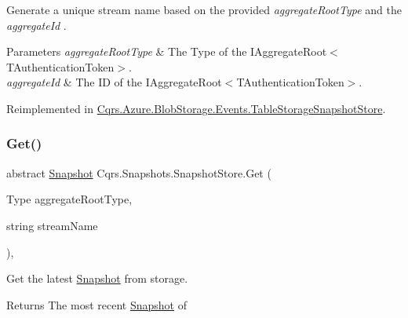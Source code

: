 Generate a unique stream name based on the provided {\itshape aggregate\+Root\+Type}  and the {\itshape aggregate\+Id} . 


\begin{DoxyParams}{Parameters}
{\em aggregate\+Root\+Type} & The Type of the I\+Aggregate\+Root$<$\+T\+Authentication\+Token$>$.\\
\hline
{\em aggregate\+Id} & The ID of the I\+Aggregate\+Root$<$\+T\+Authentication\+Token$>$.\\
\hline
\end{DoxyParams}


Reimplemented in \hyperlink{classCqrs_1_1Azure_1_1BlobStorage_1_1Events_1_1TableStorageSnapshotStore_a95503a8721d083d070495cb4f884c0cf_a95503a8721d083d070495cb4f884c0cf}{Cqrs.\+Azure.\+Blob\+Storage.\+Events.\+Table\+Storage\+Snapshot\+Store}.

\mbox{\label{classCqrs_1_1Snapshots_1_1SnapshotStore_ab2ecab1a665c0f2097929d028fe4ac69_ab2ecab1a665c0f2097929d028fe4ac69}} 
\subsubsection{\texorpdfstring{Get()}{Get()}}
{\footnotesize\ttfamily abstract \hyperlink{classCqrs_1_1Snapshots_1_1Snapshot}{Snapshot} Cqrs.\+Snapshots.\+Snapshot\+Store.\+Get (\begin{DoxyParamCaption}\item[{Type}]{aggregate\+Root\+Type,  }\item[{string}]{stream\+Name }\end{DoxyParamCaption})\hspace{0.3cm}{\ttfamily [protected]}, {}}



Get the latest \hyperlink{classCqrs_1_1Snapshots_1_1Snapshot}{Snapshot} from storage. 

\begin{DoxyReturn}{Returns}
The most recent \hyperlink{classCqrs_1_1Snapshots_1_1Snapshot}{Snapshot} of
\end{DoxyReturn}


